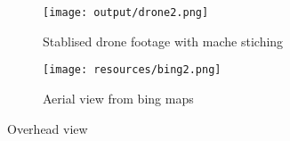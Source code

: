 \begin{figure}
  \centering
  \begin{subfigure}[b]{0.7\textwidth}
    \texttt{[image: output/drone2.png]}
    \caption{Stablised drone footage with mache stiching}
    \label{fig:drone}
  \end{subfigure}
  \begin{subfigure}[b]{0.7\textwidth}
    \texttt{[image: resources/bing2.png]}
    \caption{Aerial view from bing maps}
    \label{fig:bing}
  \end{subfigure}
	\caption{Overhead view}
\end{figure}
